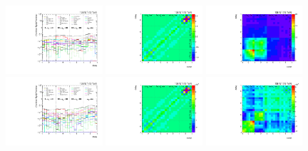 \begin{figure}[htb]
\begin{center}
 \includegraphics[width=0.32\textwidth]{fig_fullRun2UL/unfolding/combined/deltaSystCombinedlog_rebinnedB_ll_cHel_mttbar.pdf}
 \includegraphics[width=0.32\textwidth]{fig_fullRun2UL/unfolding/combined/StatCovMatrix_rebinnedB_ll_cHel_mttbar.pdf}
 \includegraphics[width=0.32\textwidth]{fig_fullRun2UL/unfolding/combined/TotalSystCovMatrix_rebinnedB_ll_cHel_mttbar.pdf} \\
 \includegraphics[width=0.32\textwidth]{fig_fullRun2UL/unfolding/combined/deltaSystCombinedlogNorm_rebinnedB_ll_cHel_mttbar.pdf}
 \includegraphics[width=0.32\textwidth]{fig_fullRun2UL/unfolding/combined/StatCovMatrixNorm_rebinnedB_ll_cHel_mttbar.pdf}
 \includegraphics[width=0.32\textwidth]{fig_fullRun2UL/unfolding/combined/TotalSystCovMatrixNorm_rebinnedB_ll_cHel_mttbar.pdf} \\

\end{center}
\end{figure}
